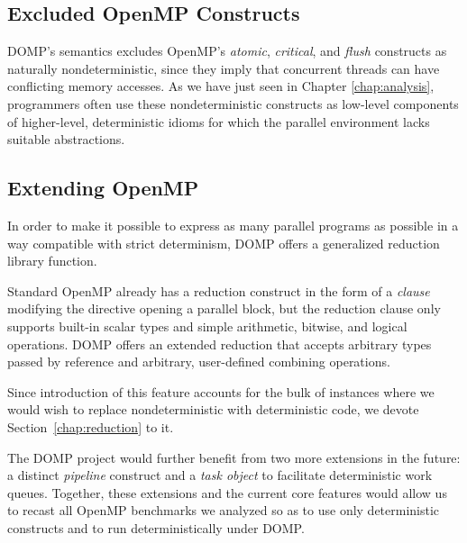 \subsection{Excluded OpenMP Constructs}
\label{subsec:domp-excluded}

DOMP's semantics excludes OpenMP's \textit{atomic}, \textit{critical}, and \textit{flush} constructs as naturally nondeterministic, since they imply that concurrent threads can have conflicting memory accesses.   As we have just seen in Chapter \ref{chap:analysis}, programmers often use these nondeterministic constructs as low-level components of higher-level, deterministic idioms for which the parallel environment lacks suitable abstractions.

\subsection{Extending OpenMP}
\label{subsec:new-features}
In order to make it possible to express as many parallel programs as possible in a way compatible with strict determinism, DOMP offers a generalized reduction library function.  

Standard OpenMP already has a reduction construct in the form of a \textit{clause} modifying the directive opening a parallel block, but the reduction clause only supports built-in scalar types and simple arithmetic, bitwise, and logical operations.  DOMP offers an extended reduction that accepts arbitrary types passed by reference and arbitrary, user-defined combining operations.  

Since introduction of this feature accounts for the bulk of instances where we would wish to replace nondeterministic with deterministic code, we devote Section~\ref{chap:reduction} to it.

The DOMP project would further benefit from two more extensions in the future:  a distinct \textit{pipeline} construct and a \textit{task object} to facilitate deterministic work queues.  Together, these extensions and the current core features would allow us to recast all OpenMP benchmarks we analyzed so as to use only deterministic constructs and to run deterministically under DOMP.

